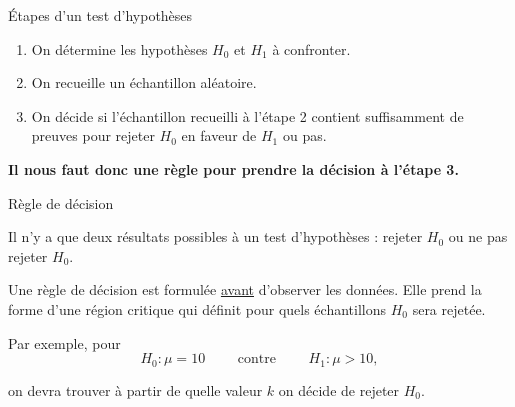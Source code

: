 \documentclass{BeamerTemplate}
\begin{document}
\begin{frame}[t]{Étapes d'un test d'hypothèses}

\begin{enumerate}
    \item On détermine les hypothèses $H_0$ et $H_1$ à confronter.
    \item On recueille un échantillon aléatoire.
    \item On décide si l'échantillon recueilli à l'étape 2 contient
    suffisamment de preuves pour rejeter $H_0$ en faveur de $H_1$ ou pas.
\end{enumerate}

\bigskip

{\bf Il nous faut donc une règle pour prendre la décision à l'étape 3.}

\end{frame}

\begin{frame}[t]{Règle de décision}

Il n'y a que deux résultats possibles à un test d'hypothèses : \alert{rejeter} $H_0$ ou
\alert{ne pas rejeter} $H_0$.
\bigskip

Une règle de décision est formulée \underline{avant} d'observer les données. Elle  prend la forme d'une \alert{région critique} qui définit pour quels échantillons $H_0$ sera rejetée.

\bigskip

Par exemple, pour
$$H_0 : \mu = 10 \qquad \mbox{ contre } \qquad  H_1 : \mu > 10,$$

on devra trouver à partir de quelle valeur $k$ on décide de rejeter $H_0$.

\bigskip

\end{frame}
\end{document}
